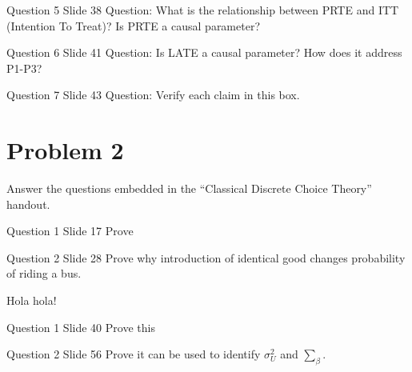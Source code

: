 \documentclass{article}
\begin{document}
\begin{problem}{Question 5 Slide 38}
Question: What is the relationship between PRTE and ITT (Intention To Treat)? Is PRTE a causal parameter?
\end{problem}
\begin{solution}
\end{solution}


\begin{problem}{Question 6 Slide 41}
Question: Is LATE a causal parameter? How does it address P1-P3?
\end{problem}
\begin{solution}
\end{solution}


\begin{problem}{Question 7 Slide 43}
Question: Verify each claim in this box.
\end{problem}
\begin{solution}
\end{solution}



\newpage
\section*{Problem 2}
Answer the questions embedded in the ``Classical Discrete Choice Theory'' handout.

\begin{problem}{Question 1 Slide 17}
Prove
\end{problem}
\begin{solution}
\end{solution}

\begin{problem}{Question 2 Slide 28}
Prove why introduction of identical good changes probability of riding a bus.
\end{problem}
\begin{solution}
Hola hola!
\end{solution}


\begin{problem}{Question 1 Slide 40}
Prove this
\end{problem}
\begin{solution}
\end{solution}

\begin{problem}{Question 2 Slide 56}
Prove it can be used to identify $\sigma_{U}^{2}$ and $\sum_{\beta}$.
\end{problem}
\begin{solution}
\end{solution}
\end{document}
